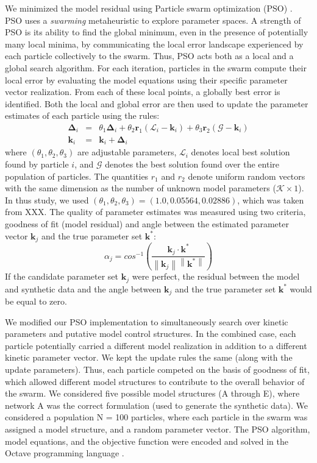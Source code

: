 \documentclass[12pt]{article}
\newcommand{\norm}[1]{\left\lVert#1\right\rVert}
\begin{document}
We minimized the model residual using Particle swarm optimization (PSO) \citep{PSO}.
PSO uses a \textit{swarming} metaheuristic to explore parameter spaces. 
A strength of PSO is its ability to find the global minimum, even in the presence of potentially many local minima, by communicating the local
error landscape experienced by each particle collectively to the swarm. Thus, PSO acts both as a local and a global search algorithm. 
For each iteration, particles in the swarm compute their local error by evaluating the model equations using their specific parameter vector realization.
From each of these local points, a globally best error is identified. Both the local and global error 
are then used to update the parameter estimates of each particle using the rules:
\begin{eqnarray}
	\mathbf{\Delta}_{i} &=&\theta_{1}\mathbf{\Delta}_{i} + \theta_{2}\mathbf{r}_{1}\left(\mathcal{L}_{i} - \mathbf{k}_{i}\right) + \theta_{3}\mathbf{r}_{2}\left(\mathcal{G} - \mathbf{k}_{i}\right) \\
	\mathbf{k}_{i} &=& \mathbf{k}_{i} + \mathbf{\Delta}_{i}
\end{eqnarray}where $\left(\theta_{1},\theta_{2},\theta_{3}\right)$ are adjustable parameters, $\mathcal{L}_{i}$ denotes local best solution found by particle $i$, and
$\mathcal{G}$ denotes the best solution found over the entire population of particles. The quantities $r_{1}$ and $r_{2}$ denote uniform random vectors with the same dimension as the number of unknown model
parameters ($\mathcal{K}\times{1}$). In thus study, we used $\left(\theta_{1},\theta_{2},\theta_{3}\right) = \left(1.0, 0.05564, 0.02886\right)$, which was taken from XXX. The quality of parameter
estimates was measured using two criteria, goodness of fit (model residual) and angle between the estimated parameter vector $\mathbf{k}_{j}$ and the true parameter set $\mathbf{k}^{*}$:
\begin{equation}
	\alpha_{j} = cos^{-1}\left(\frac{\mathbf{k}_{j}\cdot{\mathbf{k^{*}}}}{\norm{\mathbf{k}_{j}}\norm{\mathbf{k^{*}}}}\right)
\end{equation}If the candidate parameter set $\mathbf{k}_{j}$ were perfect, the residual between the model and synthetic data 
and the angle between $\mathbf{k}_{j}$ and the true parameter set $\mathbf{k}^{*}$ would be equal to zero.

We modified our PSO implementation to simultaneously search over kinetic parameters and putative model control structures.
In the combined case, each particle potentially carried a different model realization in addition to a different kinetic parameter vector. 
We kept the update rules the same (along with the update parameters). 
Thus, each particle competed on the basis of goodness of fit, which allowed different model structures to contribute to the overall behavior of the swarm. 
We considered five possible model structures (A through E), where network A was the correct formulation (used to generate the synthetic data). 
We considered a population N = 100 particles, where each particle in the swarm was assigned a model structure, and a random parameter vector.
The PSO algorithm, model equations, and the objective function were encoded and solved in the Octave programming language \citep{Octave:2014}.
\end{document}
